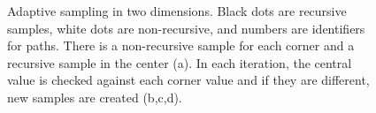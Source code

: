 \documentclass{egpubl}
\begin{document}
\begin{figure}[ht]
{		\label{fig:sampling:adaptive:3}
	}
	\hfill
	\hfill
	\caption{Adaptive sampling in two dimensions. Black dots are recursive samples, white dots are non-recursive, and numbers are identifiers for paths. There is a non-recursive sample for each corner and a recursive sample in the center (a). In each iteration, the central value is checked against each corner value and if they are different, new samples are created (b,c,d).}
	\label{fig:sampling:adaptive}
\end{figure}
\end{document}
